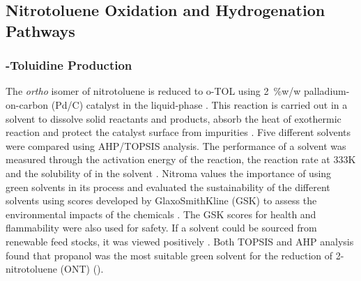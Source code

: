 

\subsection{Nitrotoluene Oxidation and Hydrogenation Pathways}
\subsubsection{\ortho-Toluidine Production}
The \textit{ortho} isomer of nitrotoluene is reduced to o-TOL using  \SI{2}{\percent}w/w palladium-on-carbon (Pd/C) catalyst in the liquid-phase \cite{rajadhyaksha_solvent_1986}. This reaction is carried out in a solvent to dissolve solid reactants and products, absorb the heat of exothermic reaction and protect the catalyst surface from impurities \cite{yao_kinetics_1959}. Five different solvents were compared using AHP/TOPSIS analysis. The performance of a solvent was measured through the activation energy of the reaction, the reaction rate at 333K and the solubility of  in the solvent \cite{rajadhyaksha_solvent_1986}. Nitroma values the importance of using green solvents in its process and evaluated the sustainability of the different solvents using scores developed by GlaxoSmithKline (GSK) to assess the environmental impacts of the chemicals \cite{henderson_expanding_2011}. The GSK scores for health and flammability were also used for safety. If a solvent could be sourced from renewable feed stocks, it was viewed positively \cite{byrne_tools_2016}. Both TOPSIS and AHP analysis found that propanol was the most suitable green solvent for the reduction of 2-nitrotoluene (ONT) ().



